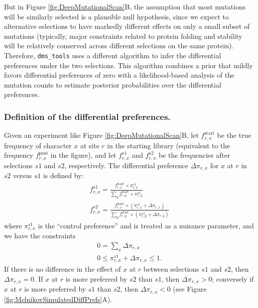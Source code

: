 \documentclass[twocolumn]{bmcart}%
\begin{document}
But in Figure \ref{fig:DeepMutationalScan}B, the assumption that most mutations will be similarly selected is a plausible null hypothesis, since we expect to alternative selections to have markedly different effects on only a small subset of mutations (typically, major constraints related to protein folding and stability will be relatively conserved across different selections on the same protein). Therefore, \texttt{dms\_tools} uses a different algorithm to infer the differential preferences under the two selections. This algorithm combines a prior that mildly favors differential preferences of zero with a likelihood-based analysis of the mutation counts to estimate posterior probabilities over the differential preferences.

\subsubsection*{Definition of the differential preferences.}
Given an experiment like Figure \ref{fig:DeepMutationalScan}B, let $f_{r,x}^{\textrm{start}}$ be the true frequency of character $x$ at site $r$ in the starting library (equivalent to the frequency $f_{r,x}^{\textrm{post}}$ in the figure), and let $f_{r,x}^{s1}$ and $f_{r,x}^{s2}$ be the frequencies after selections $s1$ and $s2$, respectively. The differential preference $\Delta\pi_{r,x}$ for $x$ at $r$ in $s2$ versus $s1$ is defined by:
\begin{gather}
\label{eq:controlpi}
f_{r,x}^{s1} = \frac{f_{r,x}^{\textrm{start}} \times \pi_{r,x}^{s1}}{\sum_y f_{r,y}^{\textrm{start}} \times \pi_{r,y}^{s1}} \\
\label{eq:deltapi}
f_{r,x}^{s2} = \frac{f_{r,x}^{\textrm{start}} \times \left(\pi_{r,x}^{s1} + \Delta\pi_{r,x}\right)}{\sum_y f_{r,y}^{\textrm{start}} \times \left(\pi_{r,y}^{s1} + \Delta\pi_{r,y}\right)}
\end{gather}
where $\pi_{r,x}^{s1}$ is the ``control preference'' and is treated as a nuisance parameter, and we have the constraints
\begin{gather}
\label{eq:diffprefsum}
0 = \sum\limits_x \Delta\pi_{r,x} \\
\label{eq:diffprefpluspref}
0 \le \pi_{r,x}^{s1} + \Delta\pi_{r,x} \le 1.
\end{gather}
If there is no difference in the effect of $x$ at $r$ between selections $s1$ and $s2$, then $\Delta\pi_{r,x} = 0$. If $x$ at $r$ is more preferred by $s2$ than $s1$, then $\Delta\pi_{r,x} > 0$; conversely if $x$ at $r$ is more preferred by $s1$ than $s2$, then $\Delta\pi_{r,x} < 0$ (see Figure \ref{fig:MelnikovSimulatedDiffPrefs}A).
\end{document}
